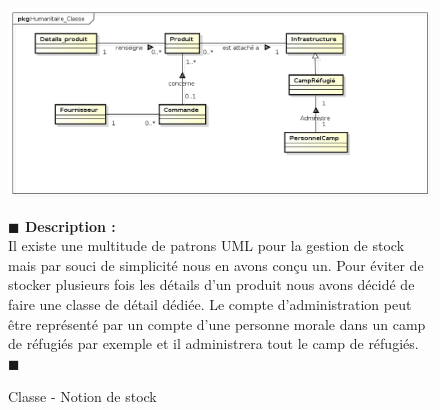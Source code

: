 \documentclass[11pt, titlepage]{report}
\newcommand{\debutDescription}{\noindent\textbf{\textcolor{DescriptionColor}{$\blacksquare$  Description : \\}}}
\newcommand{\finDescription}{\noindent\textcolor{DescriptionColor}{$\blacksquare$}}
\begin{document}
\begin{figure}[h!]
\begin{center}
\includegraphics[scale=.4]{../images/diagrammes/uml/exigence_4/classe_exigence_4.png} 
\caption{Classe - Notion de stock}
\end{center}
\debutDescription
Il existe une multitude de patrons UML pour la gestion de stock mais par souci de simplicité nous en avons conçu un. Pour éviter de stocker plusieurs fois les détails d'un produit nous avons décidé de faire une classe de détail dédiée. Le compte d'administration peut être représenté par un compte d'une personne morale dans un camp de réfugiés par exemple et il administrera tout le camp de réfugiés.
\finDescription
\end{figure}
\end{document}
